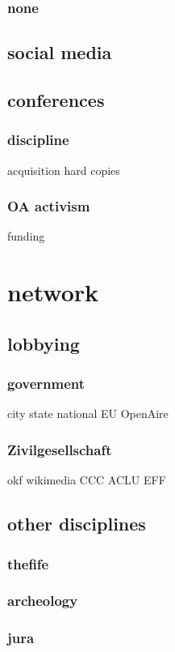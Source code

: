 \documentclass[output=guidelines,guidelines] {langscibook}
\begin{document}
\subsubsection{none}
\subsection{social media}
\subsection{conferences}
\subsubsection{discipline}
                    acquisition
                    hard copies
\subsubsection{OA activism}
                    funding
\section{network}
\subsection{lobbying}
\subsubsection{government}
                    city 
                    state
                    national
                    EU
                        OpenAire
\subsubsection{Zivilgesellschaft}
                    okf
                    wikimedia
                    CCC
                    ACLU
                    EFF
\subsection{other disciplines}
\subsubsection{thefife}
\subsubsection{archeology}
\subsubsection{jura}
\end{document}
